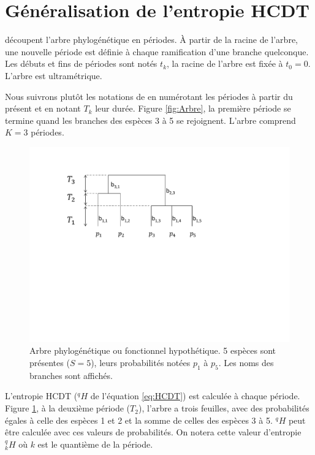 \documentclass[
  11pt,
  french,
  a4paper,
  extrafontsizes,onecolumn,openright
  ]{memoir}
\begin{document}
\section{Généralisation de l'entropie HCDT}\label{guxe9nuxe9ralisation-de-lentropie-hcdt}

\textcite{Pavoine2009} découpent l'arbre phylogénétique en périodes.
À partir de la racine de l'arbre, une nouvelle période est définie à chaque ramification d'une branche quelconque.
Les débuts et fins de périodes sont notés \(t_k\), la racine de l'arbre est fixée à \(t_0=0\).
L'arbre est ultramétrique.

Nous suivrons plutôt les notations de \textcite{Chao2010} en numérotant les périodes à partir du présent et en notant \(T_k\) leur durée.
Figure \ref{fig:Arbre}, la première période se termine quand les branches des espèces 3 à 5 se rejoignent.
L'arbre comprend \(K=3\) périodes.



\scriptsize

\begin{figure}

{\centering \includegraphics[width=0.8\linewidth]{images/ArbreA} 

}

\caption{Arbre phylogénétique ou fonctionnel hypothétique. 5 espèces sont présentes (\(S=5\)), leurs probabilités notées \(p_1\) à \(p_5\). Les noms des branches sont affichés.}\label{fig:ArbreA5}
\end{figure}

\normalsize

L'entropie HCDT (\(^{q}\!H\) de l'équation \eqref{eq:HCDT}) est calculée à chaque période.
Figure \ref{fig:ArbreA5}, à la deuxième période (\(T_2\)), l'arbre a trois feuilles, avec des probabilités égales à celle des espèces 1 et 2 et la somme de celles des espèces 3 à 5.
\(^{q}\!H\) peut être calculée avec ces valeurs de probabilités.
On notera cette valeur d'entropie \(^{q}_{k}\!H\) où \(k\) est le quantième de la période.
\end{document}

